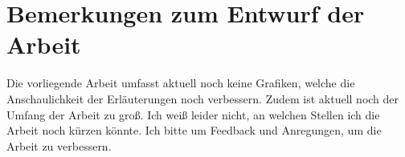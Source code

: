 \section*{Bemerkungen zum Entwurf der Arbeit}

Die vorliegende Arbeit umfasst aktuell noch keine Grafiken, welche die Anschaulichkeit der Erläuterungen noch verbessern. Zudem ist aktuell noch der Umfang der Arbeit zu groß. Ich weiß leider nicht, an welchen Stellen ich die Arbeit noch kürzen könnte. Ich bitte um Feedback und Anregungen, um die Arbeit zu verbessern.